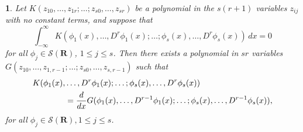 \documentclass{surv-l}
\theoremstyle{plain}
\newtheorem{lemma}[theorem]{\sc{Lemma}}
\theoremstyle{definition}
\numberwithin{equation}{chapter}
\begin{document}
\setcounter{theorem}{25}
\begin{lemma}\label{lem35.26}
Let $K(z_{10},\ldots,z_{1r};\ldots;z_{s0},\ldots,z_{sr})$ be a polynomial in the $s(r+1)$ variables $z_{ij}$ with no constant terms, and suppose that
\setcounter{equation}{26}
\begin{equation}\label{eq35.27}
\int_{-\infty}^{\infty}K(\phi_{1}(x),\ldots,D^{r}\phi_{1}(x);\ldots;\phi_{s}(x),\ldots, D^{r}\phi_{s}(x))\,dx=0
\end{equation}
for all $\phi_{j}\in \mathscr{S}(\mathbf{R})$, $1\leq j\leq s$. Then there exists a polynomial in $sr$ variables $G(z_{10},\ldots,z_{1,r-1};\ldots;z_{s0}, \ldots, z_{s,r-1})$ such that
\begin{align}\label{eq35.28}
K(\phi_{1}(x),&\ldots, D^{r}\phi_{1}(x);\ldots;\phi_{s}(x), \ldots, D^{r}\phi_{s}(x))\\
&=\frac{d}{dx}G(\phi_{1}(x), \ldots, D^{r-1}\phi_{1}(x);\ldots;\phi_{s}(x),\ldots, D^{r-1}\phi_{s}(x)),\notag
\end{align}
for all $\phi_{j}\in \mathscr{S}(\mathbf{R}), 1\leq j\leq s$.
\end{lemma}
\end{document}
